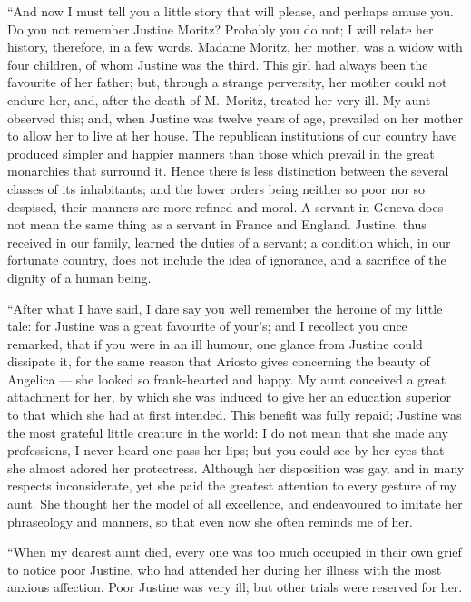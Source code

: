 ``And now I must tell you a little
story that will please, and perhaps
amuse you. Do you not remember
Justine Moritz? Probably you do not;
I will relate her history, therefore, in a
few words. Madame Moritz, her mother,
was a widow with four children,
of whom Justine was the third. This
girl had always been the favourite of
her father; but, through a strange perversity,
her mother could not endure
her, and, after the death of M.~Moritz,
treated her very ill. My aunt observed
this; and, when Justine was twelve
years of age, prevailed on her mother
to allow her to live at her house. The
republican institutions of our country
have produced simpler and happier
manners than those which prevail in
the great monarchies that surround it.
Hence there is less distinction between
the several classes of its inhabitants;
and the lower orders being neither so
poor nor so despised, their manners
are more refined and moral. A servant
in Geneva does not mean the same
thing as a servant in France and England.
Justine, thus received in our family,
learned the duties of a servant; a
condition which, in our fortunate country,
does not include the idea of ignorance,
and a sacrifice of the dignity of
a human being.

``After what I have said, I dare say
you well remember the heroine of my
little tale: for Justine was a great favourite
of your's; and I recollect you
once remarked, that if you were in an
ill humour, one glance from Justine
could dissipate it, for the same reason
that Ariosto gives concerning the beauty
of Angelica --- she looked so frank-hearted
and happy. My aunt conceived a great
attachment for her, by which she was
induced to give her an education superior
to that which she had at first
intended. This benefit was fully repaid;
Justine was the most grateful
little creature in the world: I do not
mean that she made any professions, I
never heard one pass her lips; but you
could see by her eyes that she almost
adored her protectress. Although her
disposition was gay, and in many respects
inconsiderate, yet she paid the
greatest attention to every gesture of
my aunt. She thought her the model
of all excellence, and endeavoured to
imitate her phraseology and manners,
so that even now she often reminds me
of her.

``When my dearest aunt died, every
one was too much occupied in their
own grief to notice poor Justine, who
had attended her during her illness
with the most anxious affection. Poor
Justine was very ill; but other trials
were reserved for her.

